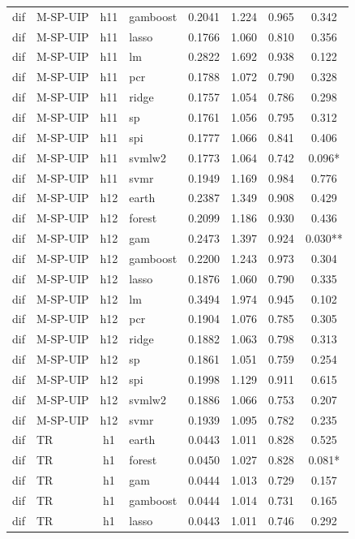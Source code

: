 \begin{ThreePartTable}
\begin{longtable}[t]{llclcccc}
dif & M-SP-UIP & h11 & gamboost & 0.2041 & 1.224 & 0.965 & 0.342\\
dif & M-SP-UIP & h11 & lasso & 0.1766 & 1.060 & 0.810 & 0.356\\
dif & M-SP-UIP & h11 & lm & 0.2822 & 1.692 & 0.938 & 0.122\\
dif & M-SP-UIP & h11 & pcr & 0.1788 & 1.072 & 0.790 & 0.328\\
dif & M-SP-UIP & h11 & ridge & 0.1757 & 1.054 & 0.786 & 0.298\\
dif & M-SP-UIP & h11 & sp & 0.1761 & 1.056 & 0.795 & 0.312\\
dif & M-SP-UIP & h11 & spi & 0.1777 & 1.066 & 0.841 & 0.406\\
dif & M-SP-UIP & h11 & svmlw2 & 0.1773 & 1.064 & 0.742 & 0.096*\\
dif & M-SP-UIP & h11 & svmr & 0.1949 & 1.169 & 0.984 & 0.776\\
\addlinespace
dif & M-SP-UIP & h12 & earth & 0.2387 & 1.349 & 0.908 & 0.429\\
dif & M-SP-UIP & h12 & forest & 0.2099 & 1.186 & 0.930 & 0.436\\
dif & M-SP-UIP & h12 & gam & 0.2473 & 1.397 & 0.924 & 0.030**\\
dif & M-SP-UIP & h12 & gamboost & 0.2200 & 1.243 & 0.973 & 0.304\\
dif & M-SP-UIP & h12 & lasso & 0.1876 & 1.060 & 0.790 & 0.335\\
dif & M-SP-UIP & h12 & lm & 0.3494 & 1.974 & 0.945 & 0.102\\
dif & M-SP-UIP & h12 & pcr & 0.1904 & 1.076 & 0.785 & 0.305\\
dif & M-SP-UIP & h12 & ridge & 0.1882 & 1.063 & 0.798 & 0.313\\
dif & M-SP-UIP & h12 & sp & 0.1861 & 1.051 & 0.759 & 0.254\\
dif & M-SP-UIP & h12 & spi & 0.1998 & 1.129 & 0.911 & 0.615\\
dif & M-SP-UIP & h12 & svmlw2 & 0.1886 & 1.066 & 0.753 & 0.207\\
dif & M-SP-UIP & h12 & svmr & 0.1939 & 1.095 & 0.782 & 0.235\\
\addlinespace
dif & TR & h1 & earth & 0.0443 & 1.011 & 0.828 & 0.525\\
dif & TR & h1 & forest & 0.0450 & 1.027 & 0.828 & 0.081*\\
dif & TR & h1 & gam & 0.0444 & 1.013 & 0.729 & 0.157\\
dif & TR & h1 & gamboost & 0.0444 & 1.014 & 0.731 & 0.165\\
dif & TR & h1 & lasso & 0.0443 & 1.011 & 0.746 & 0.292\\

\end{longtable}
\end{ThreePartTable}
